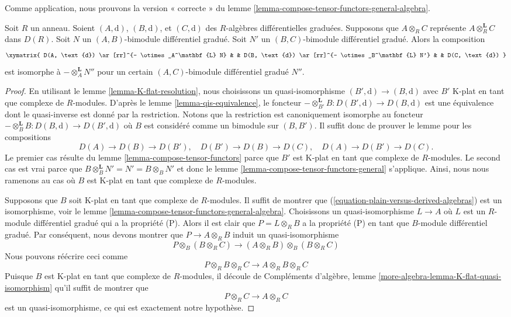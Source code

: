 \noindent
Comme application, nous prouvons la version « correcte »
du lemme \ref{lemma-compose-tensor-functors-general-algebra}.

\begin{lemma}
\label{lemma-compose-tensor-functors-tor}
Soit $R$ un anneau. Soient $(A, \text{d})$, $(B, \text{d})$, et
$(C, \text{d})$ des $R$-algèbres différentielles graduées.
Supposons que $A \otimes_R C$ représente $A \otimes^\mathbf{L}_R C$ dans
$D(R)$. Soit $N$ un $(A, B)$-bimodule différentiel
gradué. Soit $N'$ un $(B, C)$-bimodule différentiel gradué.
Alors la composition
$$
\xymatrix{
D(A, \text{d}) \ar[rr]^{- \otimes_A^\mathbf{L} N} & &
D(B, \text{d}) \ar[rr]^{- \otimes_B^\mathbf{L} N'} & &
D(C, \text{d})
}
$$
est isomorphe à $- \otimes_A^\mathbf{L} N''$ pour un certain $(A, C)$-bimodule
différentiel gradué $N''$.
\end{lemma}

\begin{proof}
En utilisant le lemme
\ref{lemma-K-flat-resolution}, nous choisissons un quasi-isomorphisme $(B', \text{d}) \to (B,
\text{d})$ avec $B'$ K-plat en tant que complexe de
$R$-modules. D'après le lemme
\ref{lemma-qis-equivalence}, le foncteur $-\otimes^\mathbf{L}_{B'} B : D(B', \text{d}) \to D(B,
\text{d})$ est une équivalence dont le quasi-inverse est donné par la
restriction. Notons que la restriction est canoniquement isomorphe au
foncteur $- \otimes^\mathbf{L}_B B : D(B, \text{d}) \to D(B', \text{d})$ où
$B$ est considéré comme un bimodule sur $(B, B')$.
Il suffit donc de prouver le lemme pour les compositions
$$
D(A) \to D(B) \to D(B'),\quad
D(B') \to D(B) \to D(C),\quad
D(A) \to D(B') \to D(C).
$$
Le premier cas résulte du lemme
\ref{lemma-compose-tensor-functors} parce que $B'$ est K-plat en tant que complexe de
$R$-modules. Le second cas est vrai parce
que $B \otimes_B^\mathbf{L} N' = N' = B \otimes_B N'$ et
donc le lemme \ref{lemma-compose-tensor-functors-general} s'applique. Ainsi,
nous nous ramenons au cas où $B$ est K-plat en tant que complexe de
$R$-modules.

\medskip\noindent
Supposons que $B$ soit K-plat en tant que complexe de $R$-modules. Il
suffit de montrer que (\ref{equation-plain-versus-derived-algebras}) est
un isomorphisme,
voir le lemme \ref{lemma-compose-tensor-functors-general-algebra}.
Choisissons un quasi-isomorphisme $L \to A$ où $L$ est un $R$-module
différentiel gradué qui a la propriété (P). Alors il est clair que $P = L
\otimes_R B$ a la propriété (P) en tant que $B$-module différentiel gradué. Par
conséquent, nous devons montrer que $P \to A \otimes_R B$
induit un quasi-isomorphisme
$$
P \otimes_B (B \otimes_R C)
\longrightarrow
(A \otimes_R B) \otimes_B (B \otimes_R C)
$$
Nous pouvons réécrire ceci comme
$$
P \otimes_R B \otimes_R C \longrightarrow A \otimes_R B \otimes_R C
$$
Puisque $B$ est K-plat en tant que complexe de
$R$-modules, il découle
de Compléments d'algèbre, lemme
\ref{more-algebra-lemma-K-flat-quasi-isomorphism} qu'il suffit de
montrer que
$$
P \otimes_R C \to A \otimes_R C
$$
est un quasi-isomorphisme, ce qui est exactement notre hypothèse.
\end{proof}

